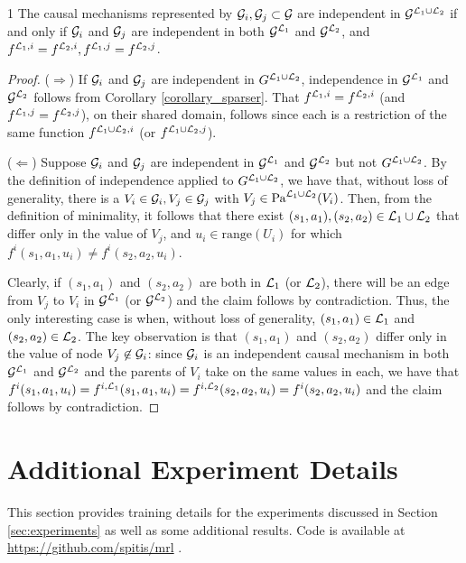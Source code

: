 \documentclass[coda.tex]{subfiles}
\begin{document}
\begin{appdxProp}{1}
The causal mechanisms represented by $\mathcal{G}_i, \mathcal{G}_j \subset \mathcal{G}$ are independent in $\mathcal{G}^{\mathcal{L}_1 \cup \mathcal{L}_2}$ if and only if  $\mathcal{G}_i$ and $\mathcal{G}_j$ are independent in both $\mathcal{G}^{\mathcal{L}_1}$ and $\mathcal{G}^{\mathcal{L}_2}$, and $f^{\mathcal{L}_1,i} = f^{\mathcal{L}_2,i}, f^{\mathcal{L}_1,j} = f^{\mathcal{L}_2,j}$.
\end{appdxProp}
\vspace{-\baselineskip}
\begin{proof}

($\Rightarrow$)
If $\mathcal{G}_i$ and $\mathcal{G}_j$ are independent in $G^{\mathcal{L}_1 \cup \mathcal{L}_2}$, independence in $\mathcal{G}^{\mathcal{L}_1}$ and $\mathcal{G}^{\mathcal{L}_2}$ follows from Corollary \ref{corollary_sparser}. That $f^{\mathcal{L}_1,i} = f^{\mathcal{L}_2,i}$ (and $f^{\mathcal{L}_1,j} = f^{\mathcal{L}_2,j}$), on their shared domain, follows since each is a restriction of the same function $f^{\mathcal{L}_1 \cup \mathcal{L}_2,i}$ (or $f^{\mathcal{L}_1 \cup \mathcal{L}_2,j}$).

($\Leftarrow$)
Suppose $\mathcal{G}_i$ and $\mathcal{G}_j$ are independent in $\mathcal{G}^{\mathcal{L}_1}$ and $\mathcal{G}^{\mathcal{L}_2}$ but not $G^{\mathcal{L}_1 \cup \mathcal{L}_2}$. By the definition of independence applied to $G^{\mathcal{L}_1 \cup \mathcal{L}_2}$, we have that, without loss of generality, there is a $V_i \in \mathcal{G}_i, V_j \in \mathcal{G}_j$ with $V_j \in \textrm{Pa}^{\mathcal{L}_1 \cup \mathcal{L}_2}(V_i)$. Then, from the definition of minimality, it follows that there exist $(s_1, a_1), (s_2, a_2) \in \mathcal{L}_1 \cup \mathcal{L}_2$ that differ only in the value of $V_j$, and $u_i \in \textrm{range}(U_i)$ for which $f^i(s_1, a_1, u_i) \not= f^i(s_2, a_2, u_i)$. 

Clearly, if $(s_1, a_1)$ and $(s_2, a_2)$ are both in $\mathcal{L}_1$ (or $\mathcal{L}_2$), there will be an edge from $V_j$ to $V_i$ in $\mathcal{G}^{\mathcal{L}_1}$ (or $\mathcal{G}^{\mathcal{L}_2}$) and the claim follows by contradiction. Thus, the only interesting case is when, without loss of generality, $(s_1, a_1) \in \mathcal{L}_1$ and $(s_2, a_2) \in \mathcal{L}_2$. 
The key observation is that $(s_1, a_1)$ and $(s_2, a_2)$ differ only in the value of node $V_j \not\in \mathcal{G}_i$: since $\mathcal{G}_i$ is an independent causal mechanism in both $\mathcal{G}^{\mathcal{L}_1}$ and $\mathcal{G}^{\mathcal{L}_2}$ and the parents of $V_i$ take on the same values in each, we have that $f^i(s_1, a_1, u_i) = f^{i,\mathcal{L}_1}(s_1, a_1, u_i) = f^{i,\mathcal{L}_2}(s_2, a_2, u_i) = f^i(s_2, a_2, u_i)$ and the claim follows by contradiction. 
\end{proof}

\section{Additional Experiment Details}\label{sec:training_details}
This section provides training details for the experiments discussed in Section \ref{sec:experiments} as well as some additional results. Code is available at \url{https://github.com/spitis/mrl} \cite{mrl}.
\end{document}
